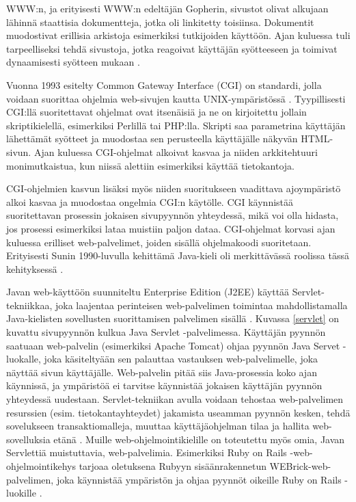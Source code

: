 WWW:n, ja erityisesti WWW:n edeltäjän Gopherin, sivustot olivat alkujaan lähinnä staattisia dokumentteja, jotka oli linkitetty toisiinsa. Dokumentit muodostivat erillisia arkistoja esimerkiksi tutkijoiden käyttöön. Ajan kuluessa tuli tarpeelliseksi tehdä sivustoja, jotka reagoivat käyttäjän syötteeseen ja toimivat dynaamisesti syötteen mukaan \cite{dynamic}.

Vuonna 1993 esitelty Common Gateway Interface (CGI) on standardi, jolla voidaan suorittaa ohjelmia web-sivujen kautta UNIX-ympäristössä \cite{rfc3875}. Tyypillisesti CGI:llä suoritettavat ohjelmat ovat itsenäisiä ja ne on kirjoitettu jollain skriptikielellä, esimerkiksi Perlillä tai PHP:lla. Skripti saa parametrina käyttäjän lähettämät syötteet ja muodostaa sen perusteella käyttäjälle näkyvän HTML-sivun. Ajan kuluessa CGI-ohjelmat alkoivat kasvaa ja niiden arkkitehtuuri monimutkaistua, kun niissä alettiin esimerkiksi käyttää tietokantoja.

CGI-ohjelmien kasvun lisäksi myös niiden suoritukseen vaadittava ajoympäristö alkoi kasvaa ja muodostaa ongelmia CGI:n käytölle. CGI käynnistää suoritettavan prosessin jokaisen sivupyynnön yhteydessä, mikä voi olla hidasta, jos prosessi esimerkiksi lataa muistiin paljon dataa. CGI-ohjelmat korvasi ajan kuluessa erilliset web-palvelimet, joiden sisällä ohjelmakoodi suoritetaan. Erityisesti Sunin 1990-luvulla kehittämä Java-kieli oli merkittävässä roolissa tässä kehityksessä \cite{uml}.

Javan web-käyttöön suunniteltu Enterprise Edition (J2EE) käyttää Serv\-let-tek\-niik\-kaa, joka laajentaa perinteisen web-palvelimen toimintaa mahdollistamalla Java-kielisten sovellusten suorittamisen palvelimen sisällä \cite{j2ee} . Kuvassa \ref{servlet} on kuvattu sivupyynnön kulkua Java Servlet -palvelimessa. Käyttäjän pyynnön saatuaan web-palvelin (esimerkiksi Apache Tomcat) ohjaa pyynnön Java Servet -luokalle, joka käsiteltyään sen palauttaa vastauksen web-palvelimelle, joka näyttää sivun käyttäjälle. Web-palvelin pitää siis Java-prosessia koko ajan käynnissä, ja ympäristöä ei tarvitse käynnistää jokaisen käyttäjän pyynnön yhteydessä uudestaan. Servlet-tekniikan avulla voidaan tehostaa web-palvelimen resurssien (esim. tietokantayhteydet) jakamista useamman pyynnön kesken, tehdä sovelukseen transaktiomalleja, muuttaa käyttäjäohjelman tilaa ja hallita web-sovelluksia etänä \cite{uml}. Muille web-ohjelmointikielille on toteutettu myös omia, Javan Servlettiä muistuttavia, web-palvelimia. Esimerkiksi Ruby on Rails -web-ohjelmointikehys tarjoaa oletuksena Rubyyn sisäänrakennetun WEBrick-web-palvelimen, joka käynnistää ympäristön ja ohjaa pyynnöt oikeille Ruby on Rails -luokille \cite{ruby2011agile}.

